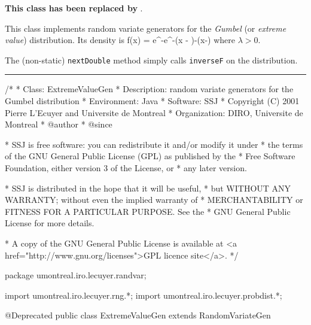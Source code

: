 
\textbf{This class has been replaced by }.

This class implements random variate generators for the \emph{Gumbel}
(or {\em extreme value\/}) distribution. Its density is
\eq
    f(x) = \lambda e^{-e^{-\lambda(x - \alpha)}-\lambda(x-\alpha)}
\endeq
where $\lambda>0$.

The (non-static) \texttt{nextDouble} method simply calls \texttt{inverseF} on the
distribution.

\bigskip\hrule

\begin{code}
\begin{hide}
/*
 * Class:        ExtremeValueGen
 * Description:  random variate generators for the Gumbel distribution
 * Environment:  Java
 * Software:     SSJ 
 * Copyright (C) 2001  Pierre L'Ecuyer and Universite de Montreal
 * Organization: DIRO, Universite de Montreal
 * @author       
 * @since

 * SSJ is free software: you can redistribute it and/or modify it under
 * the terms of the GNU General Public License (GPL) as published by the
 * Free Software Foundation, either version 3 of the License, or
 * any later version.

 * SSJ is distributed in the hope that it will be useful,
 * but WITHOUT ANY WARRANTY; without even the implied warranty of
 * MERCHANTABILITY or FITNESS FOR A PARTICULAR PURPOSE.  See the
 * GNU General Public License for more details.

 * A copy of the GNU General Public License is available at
   <a href="http://www.gnu.org/licenses">GPL licence site</a>.
 */
\end{hide}
package umontreal.iro.lecuyer.randvar;\begin{hide}
import umontreal.iro.lecuyer.rng.*;
import umontreal.iro.lecuyer.probdist.*;
\end{hide}

@Deprecated
public class ExtremeValueGen extends RandomVariateGen \begin{hide} {
   protected double alpha = -1.0;
   protected double lambda = -1.0;

\end{hide}
\end{code}

